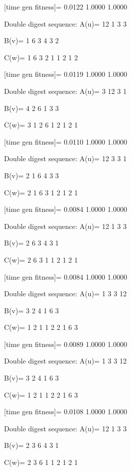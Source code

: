[time gen fitness]=
    0.0122    1.0000    1.0000

Double digest sequence:
A(u)=
    12     1     3     3

B(v)=
     1     6     3     4     3     2

C(w)=
     1     6     3     2     1     1     2     1     2

[time gen fitness]=
    0.0119    1.0000    1.0000

Double digest sequence:
A(u)=
     3    12     3     1

B(v)=
     4     2     6     1     3     3

C(w)=
     3     1     2     6     1     2     1     2     1

[time gen fitness]=
    0.0110    1.0000    1.0000

Double digest sequence:
A(u)=
    12     3     3     1

B(v)=
     2     1     6     4     3     3

C(w)=
     2     1     6     3     1     2     1     2     1

[time gen fitness]=
    0.0084    1.0000    1.0000

Double digest sequence:
A(u)=
    12     1     3     3

B(v)=
     2     6     3     4     3     1

C(w)=
     2     6     3     1     1     2     1     2     1

[time gen fitness]=
    0.0084    1.0000    1.0000

Double digest sequence:
A(u)=
     1     3     3    12

B(v)=
     3     2     4     1     6     3

C(w)=
     1     2     1     1     2     2     1     6     3

[time gen fitness]=
    0.0089    1.0000    1.0000

Double digest sequence:
A(u)=
     1     3     3    12

B(v)=
     3     2     4     1     6     3

C(w)=
     1     2     1     1     2     2     1     6     3

[time gen fitness]=
    0.0108    1.0000    1.0000

Double digest sequence:
A(u)=
    12     1     3     3

B(v)=
     2     3     6     4     3     1

C(w)=
     2     3     6     1     1     2     1     2     1

